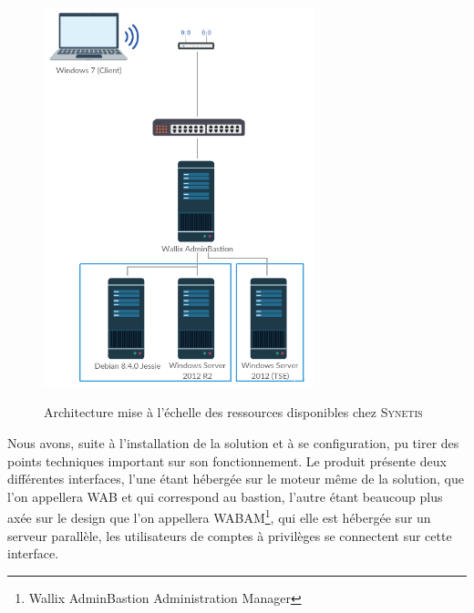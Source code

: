 \begin{figure}[!ht]
    \center
    \includegraphics[width=0.7\textwidth]{./images/PoC_archi_reelle.png}
    \label{fig:archi_reelle}
    \caption{Architecture mise à l'échelle des ressources disponibles chez \textsc{Synetis}}
\end{figure}

Nous avons, suite à l'installation de la solution et à se configuration, pu tirer des points techniques important sur son fonctionnement. Le produit présente deux différentes interfaces, l'une étant hébergée sur le moteur même de la solution, que l'on appellera WAB et qui correspond au \gls{bastion}, l'autre étant beaucoup plus axée sur le design que l'on appellera WABAM\footnote{Wallix AdminBastion Administration Manager}, qui elle est hébergée sur un serveur parallèle, les utilisateurs de comptes à privilèges se connectent sur cette interface.\\

